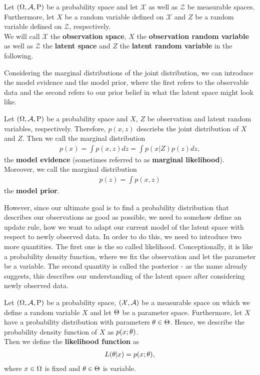 \begin{definition}\label{def:spaces}
Let $(\Omega, \operatorname{\mathcal{A}}, \operatorname{\text{P}})$ be a probability space and let $\mathcal{X}$ as well as $\mathcal{Z}$ be measurable spaces. Furthermore, let $X$ be a random variable defined on $\mathcal{X}$ and $Z$ be a random variable defined on $\mathcal{Z}$, respectively.\\
We will call $\mathcal{X}$ the \textbf{observation space}, $X$ the \textbf{observation random variable} as well as $\mathcal{Z}$ the \textbf{latent space} and $Z$ the \textbf{latent random variable} in the following.
\end{definition}

Considering the marginal distributions of the joint distribution, we can introduce the model evidence and the model prior, where the first refers to the observable data and the second refers to our prior belief in what the latent space might look like.

\begin{definition}
Let $(\Omega, \operatorname{\mathcal{A}}, \operatorname{\text{P}})$ be a probability space and $X$, $Z$ be observation and latent random variables, respectively. Therefore, $p(x, z)$ descriebs the joint distribution of $X$ and $Z$. Then we call the marginal distribution
\begin{align*}
p(x) = \int p(x, z) dz = \int p(x|Z) p(z) dz,
\end{align*}
the \textbf{model evidence} (sometimes referred to as \textbf{marginal likelihood}).\\
Moreover, we call the marginal distribution
\begin{align*}
p(z) = \int p(x,z)
\end{align*}
the \textbf{model prior}.
\end{definition}

However, since our ultimate goal is to find a probability distribution that describes our observations as good as possible, we need to somehow define an update rule, how we want to adapt our current model of the latent space with respect to newly observed data. In order to do this, we need to introduce two more quantities. The first one is the so called likelihood. Conceptionally, it is like a probability density function, where we fix the observation and let the parameter be a variable. The second quantity is called the posterior - as the name already suggests, this describes our understanding of the latent space after considering newly observed data.

\begin{definition}\label{def:likelihood}
Let $(\Omega,\operatorname{\mathcal{A}}, \operatorname{\text{P}})$ be a probability space, $(\mathcal{X}, \operatorname{\mathcal{A}})$ be a measurable space on which we define a random variable $X$ and let $\operatorname{\Theta}$ be a parameter space. Furthermore, let $X$ have a probability distribution with parameters $\theta\in\operatorname{\Theta}$. Hence, we describe the probability density function of $X$ as $p(x;\theta)$.\\
Then we define the \textbf{likelihood function} as
\begin{align*}
L(\theta | x) = p(x; \theta),
\end{align*}
where $x\in\Omega$ is fixed and $\theta\in\operatorname{\Theta}$ is variable.
\end{definition}

